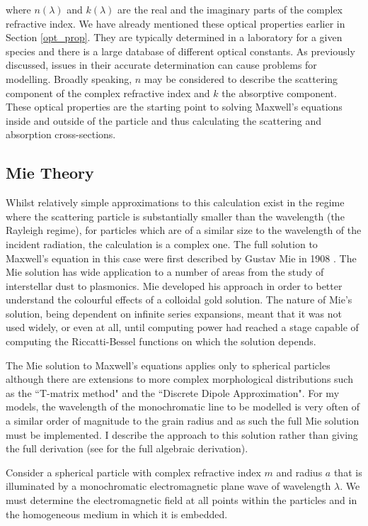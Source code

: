 \noindent where $n(\lambda)$ and $k(\lambda)$ are the real and the imaginary parts of the complex refractive index.  We have already mentioned these optical properties earlier in Section \ref{opt_prop}.  They are typically determined in a laboratory for a given species and there is a large database of different optical constants.  As previously discussed, issues in their accurate determination can cause problems for modelling.  Broadly speaking, $n$ may be considered to describe the scattering component of the complex refractive index and $k$ the absorptive component.  These optical properties are the starting point to solving Maxwell's equations inside and outside of the particle and thus calculating the scattering and absorption cross-sections.

\subsection{Mie Theory}
\label{scn:mie_theory}

Whilst relatively simple approximations to this calculation exist in the regime where the scattering particle is substantially smaller than the wavelength (the Rayleigh regime), for particles which are of a similar size to the wavelength of the incident radiation, the calculation is a complex one.  The full solution to Maxwell's equation in this case were first described by Gustav Mie in 1908 \citep{Mie1908}.  The Mie solution has wide application to a number of areas from the study of interstellar dust to plasmonics.  Mie developed his approach in order to better understand the colourful effects of a colloidal gold solution.  The nature of Mie's solution, being dependent on infinite series expansions, meant that it was not used widely, or even at all, until computing power had reached a stage capable of computing the Riccatti-Bessel functions on which the solution depends.

The Mie solution to Maxwell's equations applies only to spherical particles although there are extensions to more complex morphological distributions such as the ``T-matrix method" and the ``Discrete Dipole Approximation".  For my models, the wavelength of the monochromatic line to be modelled is very often of a similar order of magnitude to the grain radius and as such the full Mie solution must be implemented.  I describe the approach to this solution rather than giving the full derivation (see \citet{Bohren1983} for the full algebraic derivation).

Consider a spherical particle with complex refractive index $m$ and radius $a$ that is illuminated by a monochromatic electromagnetic plane wave of wavelength $\lambda$.  We must determine the electromagnetic field at all points within the particles and in the homogeneous medium in which it is embedded.



